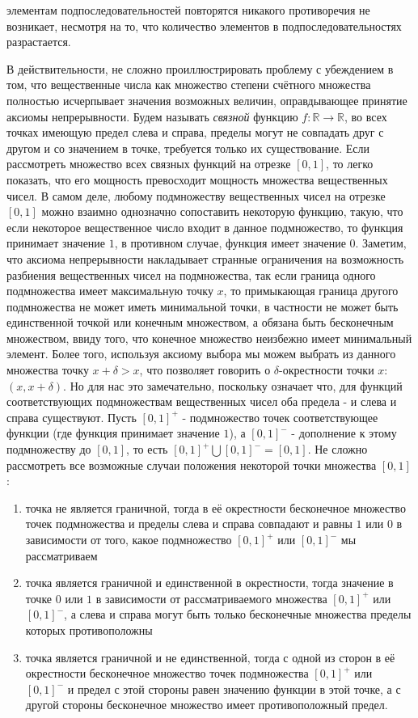 \documentclass[12pt]{article}
\begin{document}
элементам подпоследовательностей повторятся никакого противоречия не возникает, несмотря на то, что количество элементов в подпоследовательностях разрастается.

В действительности, не сложно проиллюстрировать проблему с убеждением в том, что вещественные числа как множество степени счётного множества полностью исчерпывает значения возможных величин, оправдывающее принятие аксиомы непрерывности. Будем называть {\it связной} функцию $f: \mathbb{R} \to \mathbb{R}$, во всех точках имеющую предел слева и справа, пределы могут не совпадать друг с другом и со значением в точке, требуется только их существование. Если рассмотреть множество всех связных функций на отрезке $[0, 1]$, то легко показать, что его мощность превосходит мощность множества вещественных чисел. В самом деле, любому подмножеству вещественных чисел на отрезке $[0, 1]$ можно взаимно однозначно сопоставить некоторую функцию, такую, что если некоторое вещественное число входит в данное подмножество, то функция принимает значение $1$, в противном случае, функция имеет значение $0$. Заметим, что аксиома непрерывности накладывает странные ограничения на возможность разбиения вещественных чисел на подмножества, так если граница одного подмножества имеет максимальную точку $x$, то примыкающая граница другого подмножества не может иметь минимальной точки, в частности не может быть единственной точкой или конечным множеством, а обязана быть бесконечным множеством, ввиду того, что конечное множество неизбежно имеет минимальный элемент. Более того, используя аксиому выбора мы можем выбрать из данного множества точку $x + \delta > x$, что позволяет говорить о $\delta$-окрестности точки $x$: $(x, x + \delta)$. Но для нас это замечательно, поскольку означает что, для  функций соответствующих подмножествам вещественных чисел оба предела - и слева и справа существуют. Пусть $[0, 1]^+$ - подмножество точек соответствующее функции (где функция принимает значение $1$), а $[0, 1]^-$ - дополнение к этому подмножеству до $[0, 1]$, то есть $[0, 1]^+ \bigcup [0, 1]^- = [0, 1]$. Не сложно рассмотреть все возможные случаи положения некоторой точки множества $[0, 1]$:

\begin{enumerate}
    \item точка не является граничной, тогда в её окрестности бесконечное множество точек подмножества и пределы слева и справа совпадают и равны $1$ или $0$ в зависимости от того, какое подмножество $[0, 1]^+$ или $[0, 1]^-$ мы рассматриваем
    \item точка является граничной и единственной в окрестности, тогда значение в точке $0$ или $1$ в зависимости от рассматриваемого множества $[0, 1]^+$ или $[0, 1]^-$, а слева и справа могут быть только бесконечные множества пределы которых противоположны
    \item точка является граничной и не единственной, тогда с одной из сторон в её окрестности бесконечное множество точек подмножества $[0, 1]^+$ или $[0, 1]^-$ и предел с этой стороны равен значению функции в этой точке, а с другой стороны бесконечное множество имеет противоположный предел.
\end{enumerate}
\end{document}
